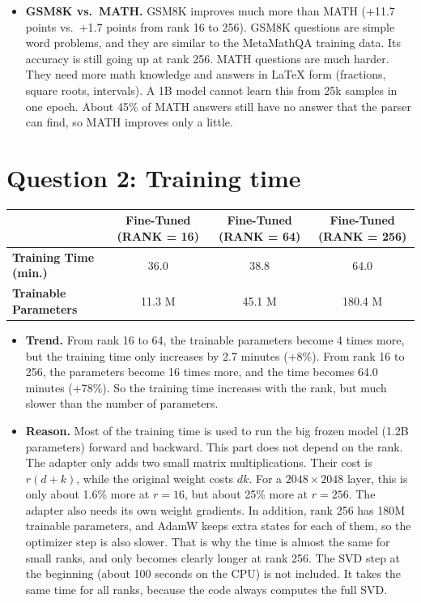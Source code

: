 \documentclass[10pt,a4paper]{article}
\begin{document}
\begin{itemize}
  \item \textbf{GSM8K vs.\ MATH.} GSM8K improves much more than MATH (+11.7 points vs.\ +1.7 points from rank 16
  to 256). GSM8K questions are simple word problems, and they are similar to the MetaMathQA training data. Its
  accuracy is still going up at rank 256. MATH questions are much harder. They need more math knowledge and answers
  in LaTeX form (fractions, square roots, intervals). A 1B model cannot learn this from 25k samples in one epoch.
  About 45\% of MATH answers still have no answer that the parser can find, so MATH improves only a little.
\end{itemize}

\section*{Question 2: Training time}
\begin{center}\small
\begin{tabularx}{0.9\textwidth}{l C C C}
  \toprule
  & \textbf{Fine-Tuned (RANK = 16)} & \textbf{Fine-Tuned (RANK = 64)} & \textbf{Fine-Tuned (RANK = 256)} \\
  \midrule
  \textbf{Training Time (min.)} & 36.0   & 38.8   & 64.0    \\
  \textbf{Trainable Parameters} & 11.3 M & 45.1 M & 180.4 M \\
  \bottomrule
\end{tabularx}
\end{center}

\begin{itemize}
  \item \textbf{Trend.} From rank 16 to 64, the trainable parameters become 4 times more, but the training time
  only increases by 2.7 minutes (+8\%). From rank 16 to 256, the parameters become 16 times more, and the time
  becomes 64.0 minutes (+78\%). So the training time increases with the rank, but much slower than the number of
  parameters.
  \item \textbf{Reason.} Most of the training time is used to run the big frozen model (1.2B parameters) forward
  and backward. This part does not depend on the rank. The adapter only adds two small matrix multiplications. Their
  cost is $r(d+k)$, while the original weight costs $dk$. For a $2048\times2048$ layer, this is only about 1.6\%
  more at $r=16$, but about 25\% more at $r=256$. The adapter also needs its own weight gradients. In addition,
  rank 256 has 180M trainable parameters, and AdamW keeps extra states for each of them, so the optimizer step is
  also slower. That is why the time is almost the same for small ranks, and only becomes clearly longer at rank 256.
  The SVD step at the beginning (about 100 seconds on the CPU) is not included. It takes the same time for all
  ranks, because the code always computes the full SVD.
\end{itemize}
\end{document}
